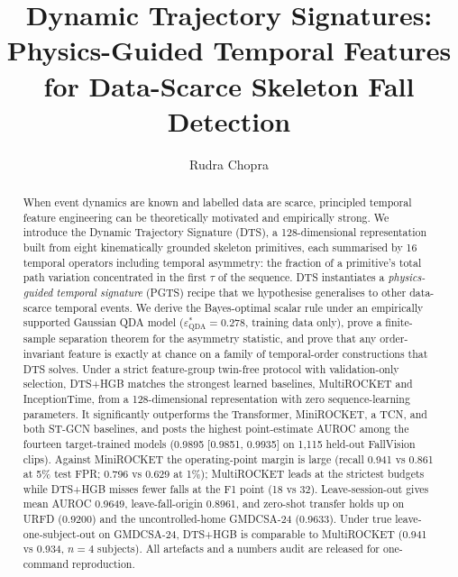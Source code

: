 \newtheorem{theorem}{Theorem}
\newtheorem{proposition}{Proposition}
\newtheorem{definition}{Definition}
\newtheorem{corollary}{Corollary}

\title{Dynamic Trajectory Signatures: Physics-Guided Temporal Features for Data-Scarce Skeleton Fall Detection}

\author{Rudra Chopra}


\maketitle

\begin{abstract}
When event dynamics are known and labelled data are scarce, principled temporal feature engineering can be theoretically motivated and empirically strong. We introduce the Dynamic Trajectory Signature (DTS), a 128-dimensional representation built from eight kinematically grounded skeleton primitives, each summarised by 16 temporal operators including temporal asymmetry: the fraction of a primitive's total path variation concentrated in the first $\tau$ of the sequence. DTS instantiates a \emph{physics-guided temporal signature} (PGTS) recipe that we hypothesise generalises to other data-scarce temporal events. We derive the Bayes-optimal scalar rule under an empirically supported Gaussian QDA model ($\varepsilon^{*}_{\mathrm{QDA}}=0.278$, training data only), prove a finite-sample separation theorem for the asymmetry statistic, and prove that any order-invariant feature is exactly at chance on a family of temporal-order constructions that DTS solves. Under a strict feature-group twin-free protocol with validation-only selection, DTS+HGB matches the strongest learned baselines, MultiROCKET and InceptionTime, from a 128-dimensional representation with zero sequence-learning parameters. It significantly outperforms the Transformer, MiniROCKET, a TCN, and both ST-GCN baselines, and posts the highest point-estimate AUROC among the fourteen target-trained models (0.9895 [0.9851, 0.9935] on 1,115 held-out FallVision clips). Against MiniROCKET the operating-point margin is large (recall 0.941 vs 0.861 at 5\% test FPR; 0.796 vs 0.629 at 1\%); MultiROCKET leads at the strictest budgets while DTS+HGB misses fewer falls at the F1 point (18 vs 32). Leave-session-out gives mean AUROC 0.9649, leave-fall-origin 0.8961, and zero-shot transfer holds up on URFD (0.9200) and the uncontrolled-home GMDCSA-24 (0.9633). Under true leave-one-subject-out on GMDCSA-24, DTS+HGB is comparable to MultiROCKET (0.941 vs 0.934, $n{=}4$ subjects). All artefacts and a numbers audit are released for one-command reproduction.
\end{abstract}

